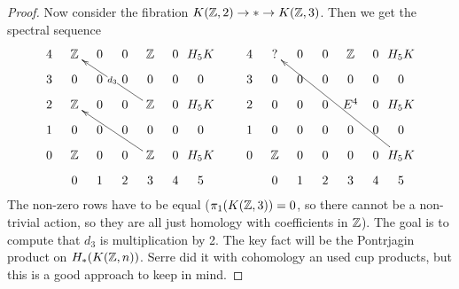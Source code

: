 \begin{proof}
 Now consider the fibration $K(\mathbb{Z},2)\to *\to K(\mathbb{Z},3)$. Then we get the spectral sequence
 \[\xymatrix@!0 @-.3pc{
  4&\ZZ & 0 & 0 & \ZZ & 0 & H_5K\\
  3&0 & 0& 0& 0& 0& 0\\
  2&\ZZ & 0 & 0 & \ZZ \ar[uulll]|{d_3} & 0 & H_5K\\
  1&0 & 0& 0& 0& 0& 0\\
  0&\ZZ & 0 & 0 & \ZZ \ar[uulll] & 0 & H_5K\\
   & 0 & 1 & 2 & 3 & 4 & 5
 }\qquad
 \xymatrix@!0 @-.3pc{
  4&? & 0 & 0 & \ZZ & 0 & H_5K\\
  3&0 & 0& 0& 0& 0& 0\\
  2&0 & 0 & 0 & E^4 & 0 & H_5K\\
  1&0 & 0& 0& 0& 0& 0\\
  0&\ZZ & 0 & 0 & 0  & 0 & H_5K \ar[uuuulllll]\\
   & 0 & 1 & 2 & 3 & 4 & 5
 }\]
 The non-zero rows have to be equal ($\pi_1(K(\mathbb{Z},3))=0$, so there cannot be a non-trivial action, so they are all just homology with coefficients in $\mathbb{Z}$). The goal is to compute that $d_3$ is multiplication by 2. The key fact will be the Pontrjagin product on $H_*(K(\mathbb{Z},n))$. Serre did it with cohomology an used cup products, but this is a good approach to keep in mind.
\end{proof}




